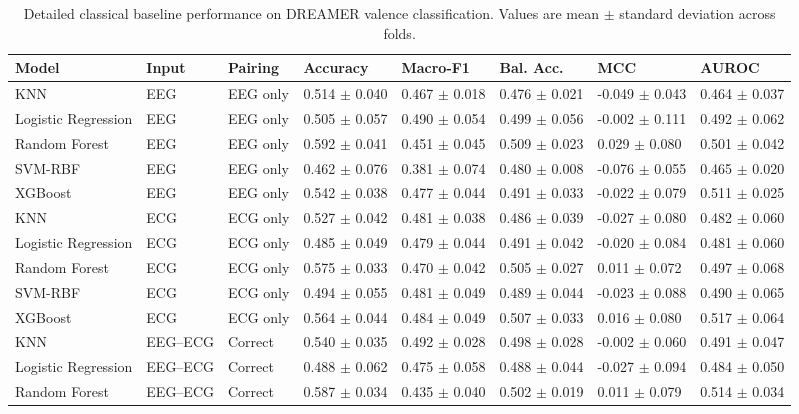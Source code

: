 \begin{table}[!t]
\centering
\caption{Detailed classical baseline performance on DREAMER valence classification. Values are mean $\pm$ standard deviation across folds.}
\label{tab:dreamer_valence_classical_detailed}
\begin{tabular}{llllllll}
\toprule
Model & Input & Pairing & Accuracy & Macro-F1 & Bal. Acc. & MCC & AUROC \\
\midrule
KNN & EEG & EEG only & 0.514 $\pm$ 0.040 & 0.467 $\pm$ 0.018 & 0.476 $\pm$ 0.021 & -0.049 $\pm$ 0.043 & 0.464 $\pm$ 0.037 \\
Logistic Regression & EEG & EEG only & 0.505 $\pm$ 0.057 & 0.490 $\pm$ 0.054 & 0.499 $\pm$ 0.056 & -0.002 $\pm$ 0.111 & 0.492 $\pm$ 0.062 \\
Random Forest & EEG & EEG only & 0.592 $\pm$ 0.041 & 0.451 $\pm$ 0.045 & 0.509 $\pm$ 0.023 & 0.029 $\pm$ 0.080 & 0.501 $\pm$ 0.042 \\
SVM-RBF & EEG & EEG only & 0.462 $\pm$ 0.076 & 0.381 $\pm$ 0.074 & 0.480 $\pm$ 0.008 & -0.076 $\pm$ 0.055 & 0.465 $\pm$ 0.020 \\
XGBoost & EEG & EEG only & 0.542 $\pm$ 0.038 & 0.477 $\pm$ 0.044 & 0.491 $\pm$ 0.033 & -0.022 $\pm$ 0.079 & 0.511 $\pm$ 0.025 \\
KNN & ECG & ECG only & 0.527 $\pm$ 0.042 & 0.481 $\pm$ 0.038 & 0.486 $\pm$ 0.039 & -0.027 $\pm$ 0.080 & 0.482 $\pm$ 0.060 \\
Logistic Regression & ECG & ECG only & 0.485 $\pm$ 0.049 & 0.479 $\pm$ 0.044 & 0.491 $\pm$ 0.042 & -0.020 $\pm$ 0.084 & 0.481 $\pm$ 0.060 \\
Random Forest & ECG & ECG only & 0.575 $\pm$ 0.033 & 0.470 $\pm$ 0.042 & 0.505 $\pm$ 0.027 & 0.011 $\pm$ 0.072 & 0.497 $\pm$ 0.068 \\
SVM-RBF & ECG & ECG only & 0.494 $\pm$ 0.055 & 0.481 $\pm$ 0.049 & 0.489 $\pm$ 0.044 & -0.023 $\pm$ 0.088 & 0.490 $\pm$ 0.065 \\
XGBoost & ECG & ECG only & 0.564 $\pm$ 0.044 & 0.484 $\pm$ 0.049 & 0.507 $\pm$ 0.033 & 0.016 $\pm$ 0.080 & 0.517 $\pm$ 0.064 \\
KNN & EEG--ECG & Correct & 0.540 $\pm$ 0.035 & 0.492 $\pm$ 0.028 & 0.498 $\pm$ 0.028 & -0.002 $\pm$ 0.060 & 0.491 $\pm$ 0.047 \\
Logistic Regression & EEG--ECG & Correct & 0.488 $\pm$ 0.062 & 0.475 $\pm$ 0.058 & 0.488 $\pm$ 0.044 & -0.027 $\pm$ 0.094 & 0.484 $\pm$ 0.050 \\
Random Forest & EEG--ECG & Correct & 0.587 $\pm$ 0.034 & 0.435 $\pm$ 0.040 & 0.502 $\pm$ 0.019 & 0.011 $\pm$ 0.079 & 0.514 $\pm$ 0.034 \\

\end{tabular}
\end{table}

